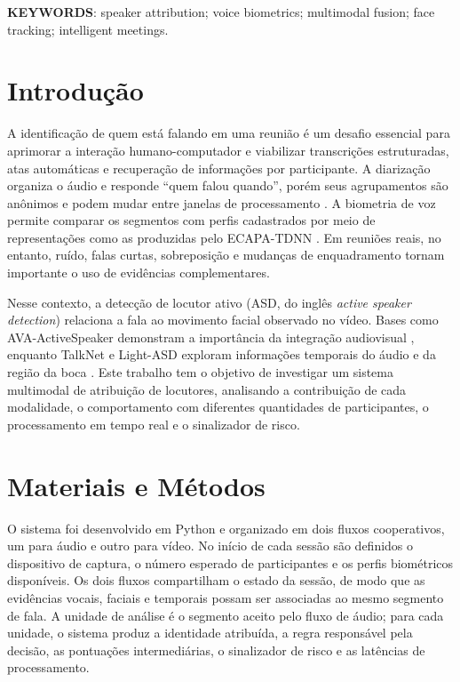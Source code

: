 \documentclass[a4paper,11pt]{article}
\begin{document}
\vspace{0.5cm}
\noindent\textbf{KEYWORDS}: speaker attribution; voice biometrics; multimodal fusion; face tracking; intelligent meetings.

\section*{Introdução}

A identificação de quem está falando em uma reunião é um desafio essencial para aprimorar a interação humano-computador e viabilizar transcrições estruturadas, atas automáticas e recuperação de informações por participante. A diarização organiza o áudio e responde ``quem falou quando'', porém seus agrupamentos são anônimos e podem mudar entre janelas de processamento \cite{bredin2023}. A biometria de voz permite comparar os segmentos com perfis cadastrados por meio de representações como as produzidas pelo ECAPA-TDNN \cite{desplanques2020}. Em reuniões reais, no entanto, ruído, falas curtas, sobreposição e mudanças de enquadramento tornam importante o uso de evidências complementares.

Nesse contexto, a detecção de locutor ativo (ASD, do inglês \textit{active speaker detection}) relaciona a fala ao movimento facial observado no vídeo. Bases como AVA-ActiveSpeaker demonstram a importância da integração audiovisual \cite{roth2020}, enquanto TalkNet e Light-ASD exploram informações temporais do áudio e da região da boca \cite{tao2021,liao2023}. Este trabalho tem o objetivo de investigar um sistema multimodal de atribuição de locutores, analisando a contribuição de cada modalidade, o comportamento com diferentes quantidades de participantes, o processamento em tempo real e o sinalizador de risco.

\section*{Materiais e Métodos}

O sistema foi desenvolvido em Python e organizado em dois fluxos cooperativos, um para áudio e outro para vídeo. No início de cada sessão são definidos o dispositivo de captura, o número esperado de participantes e os perfis biométricos disponíveis. Os dois fluxos compartilham o estado da sessão, de modo que as evidências vocais, faciais e temporais possam ser associadas ao mesmo segmento de fala. A unidade de análise é o segmento aceito pelo fluxo de áudio; para cada unidade, o sistema produz a identidade atribuída, a regra responsável pela decisão, as pontuações intermediárias, o sinalizador de risco e as latências de processamento.
\end{document}
